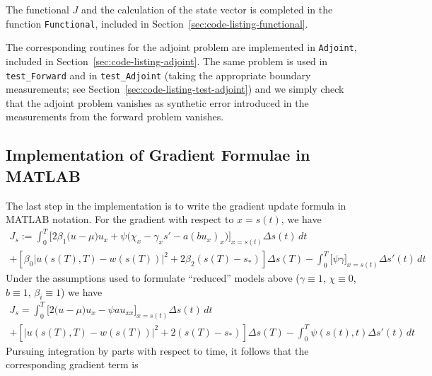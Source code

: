 \documentclass[letterpaper, 10pt]{amsart}
\theoremstyle{definition}
\theoremstyle{remark}
\newcommand{\lnorm}[1]{\left\vert #1\right\vert}%
\begin{document}
The functional $J$ and the calculation of the state vector is completed in the
function \verb+Functional+, included in Section~\ref{sec:code-listing-functional}.

The corresponding routines for the adjoint problem are implemented in \verb+Adjoint+, included in Section~\ref{sec:code-listing-adjoint}.
The same problem is used in \verb+test_Forward+ and in \verb+test_Adjoint+
(taking the appropriate boundary measurements; see
Section~\ref{sec:code-listing-test-adjoint}) and we simply check that the
adjoint problem vanishes as synthetic error introduced in the measurements from
the forward problem vanishes.

\subsection{Implementation of Gradient Formulae in MATLAB}
The last step in the implementation is to write the gradient update formula in MATLAB notation.
For the gradient with respect to $x=s(t)$, we have
\begin{gather*}
  J_{s}
  := \int_0^T \Big[2\beta_1\big(u - \mu\big)u_x + \psi \big(\chi_x - \gamma_x s'  - a (b u_x)_x \big)\Big]_{x=s(t)} {\Delta s}(t)\,dt \nonumber
  \\
  +
  \left[\beta_0\lnorm{u(s(T),T) - w(s(T))}^2 + 2 \beta_2 (s(T) - s_*)\right] {\Delta s}(T) 
  - \int_0^T \big[\psi \gamma\big]_{x=s(t)} {\Delta s}'(t) \,dt
\end{gather*}
Under the assumptions used to formulate ``reduced'' models above ($\gamma \equiv
1$, $\chi \equiv 0$, $b\equiv 1$, $\beta_i \equiv 1$) we have
\begin{gather*}
  J_{s}
  = \int_0^T \Big[2\big(u - \mu\big)u_x - \psi  a u_{xx} \Big]_{x=s(t)} {\Delta s}(t)\,dt \nonumber
  \\
  +
  \left[\lnorm{u(s(T),T) - w(s(T))}^2 + 2 (s(T) - s_*)\right] {\Delta s}(T) 
  - \int_0^T \psi(s(t),t) {\Delta s}'(t) \,dt
\end{gather*}
Pursuing integration by parts with respect to time, it follows that the corresponding gradient term is
\end{document}
